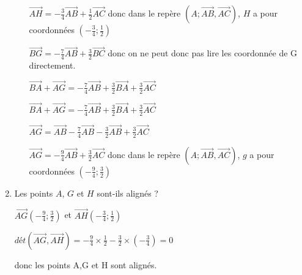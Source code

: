 \begin{enumerate}
\begin{enumerate}
$\overrightarrow{AH}=-\frac{3}{4}\overrightarrow{AB}+\frac{1}{2}\overrightarrow{AC}$  donc dans le repère $\left( A; \overrightarrow{AB},\overrightarrow{AC} \right)$, $H$ a pour coordonnées $\left(-\frac{3}{4}; \frac{1}{2}\right)$

$\overrightarrow{BG}=-\frac{7}{4}\overrightarrow{AB}+\frac{3}{2}\overrightarrow{BC}$ donc on ne peut donc pas lire les coordonnée de G directement.

$\overrightarrow{BA}+\overrightarrow{AG}=-\frac{7}{4}\overrightarrow{AB}+\frac{3}{2}\overrightarrow{BA}+\frac{3}{2}\overrightarrow{AC}$

$\overrightarrow{BA}+\overrightarrow{AG}=-\frac{7}{4}\overrightarrow{AB}+\frac{3}{2}\overrightarrow{BA}+\frac{3}{2}\overrightarrow{AC}$

$\overrightarrow{AG}=\overrightarrow{AB}-\frac{7}{4}\overrightarrow{AB}-\frac{3}{2}\overrightarrow{AB}+\frac{3}{2}\overrightarrow{AC}$


$\overrightarrow{AG}=-\frac{9}{4}\overrightarrow{AB}+\frac{3}{2}\overrightarrow{AC}$ donc dans le repère $\left( A; \overrightarrow{AB},\overrightarrow{AC} \right)$, $g$ a pour coordonnées $\left(-\frac{9}{4}; \frac{3}{2}\right)$ 

 \end{enumerate}
 \item Les points $A$, $G$ et $H$ sont-ils alignés ?
 
 
 $\overrightarrow{AG}\left(-\frac{9}{4}; \frac{3}{2}\right)$ et $\overrightarrow{AH}\left(-\frac{3}{4}; \frac{1}{2}\right)$
 
 
$ dét(\overrightarrow{AG},\overrightarrow{AH})=-\frac{9}{4} \times  \frac{1}{2} - \frac{3}{2}\times \left(-\frac{3}{4}\right)=0$ 

donc les points A,G et H sont alignés.
 
\end{enumerate}